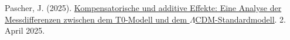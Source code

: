 \documentclass[a4paper,12pt]{article}
\newcommand{\repobase}{https://github.com/jpascher/T0-Time-Mass-Duality/tree/main/2/}
\begin{document}
	
	\begin{thebibliography}{99}
		 Pascher, J. (2025). \href{\repobase/pdf/Deutsch/Analyse der Messdifferenzen zwischen dem T0-Modell und dem Standardmodell.pdf}{Kompensatorische und additive Effekte: Eine Analyse der Messdifferenzen zwischen dem T0-Modell und dem \(\Lambda\)CDM-Standardmodell}. 2. April 2025.
	\end{thebibliography}
	
\end{document}
